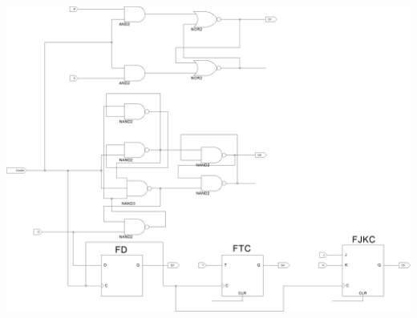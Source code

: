 \documentclass[9pt]{article}
\begin{document}
\begin{enumerate}
             \begin{center}
                \includegraphics[width=\textwidth]{schematic.png}
             \end{center} 
   
   
\end{enumerate}
\end{document}

